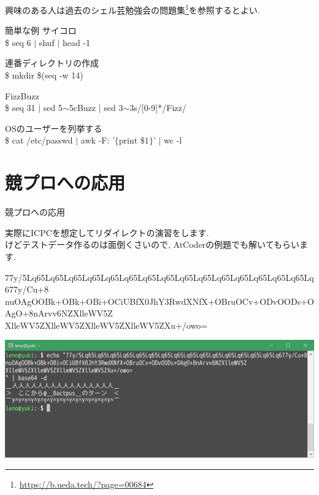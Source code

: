\documentclass[uplatex, dvipdfmx, unicode]{beamer}
\begin{document}
\begin{frame}
  興味のある人は過去のシェル芸勉強会の問題集\footnote{\url{https://b.ueda.tech/?page=00684}}を参照するとよい.
\end{frame}

\begin{frame}{簡単な例}
  サイコロ \\
  \$ seq 6 $|$ shuf $|$ head -1 \\
  \vspace{0.2in}

  連番ディレクトリの作成 \\
  \$ mkdir \$(seq -w 14)
  \vspace{0.2in}
  
  FizzBuzz \\
  \$ seq 31 $|$ sed 5$\sim$5cBuzz $|$ sed 3$\sim$3s/[0-9]*/Fizz/
  \vspace{0.2in}

  OSのユーザーを列挙する \\
  \$ cat /etc/passwd $|$ awk -F: '$\{\text{print \$1}\}$' $|$ wc -l
\end{frame}

\section{競プロへの応用}
\begin{frame}
  \centering
  \Huge{競プロへの応用}
\end{frame}

\begin{frame}
  実際にICPCを想定してリダイレクトの演習をします. \\
  けどテストデータ作るのは面倒くさいので, AtCoderの例題でも解いてもらいます. \\
\end{frame}

\begin{frame}
  \fontsize{7pt}{0pt}\selectfont
  77y/5Lq65Lq65Lq65Lq65Lq65Lq65Lq65Lq65Lq65Lq65Lq65Lq65Lq65Lq65Lq65Lq677y/Cu+8 \\
  nuOAgOOBk+OBk+OBi+OCiUBfX0JhY3RwdXNfX+OBruOCv+ODvOODs+OAgO+8nArvv6NZXlleWV5Z \\
  XlleWV5ZXlleWV5ZXlleWV5ZXlleWV5ZXu+/owo=
\end{frame}

\begin{frame}
  \includegraphics[keepaspectratio, scale=.5]{./img/sd.png}
\end{frame}
\end{document}
